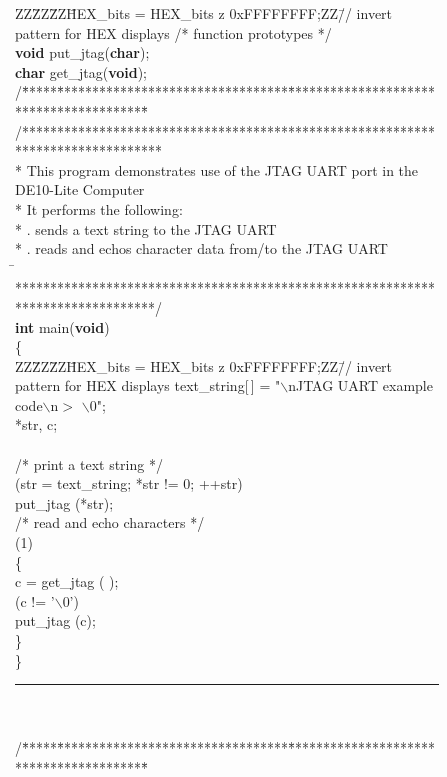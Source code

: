 \begin{figure}[h!]
\begin{center}
\begin{minipage}[t]{12.5 cm}
\begin{tabbing}
ZZ\=ZZ\=ZZ\=HEX\_bits = HEX\_bits z 0xFFFFFFFF;ZZ\=// invert pattern for HEX displays\kill
/* function prototypes */\\
{\bf void} put\_jtag({\bf char});\\
{\bf char} get\_jtag({\bf void});\\
/\=*****\=*********************************\=****************************************\=\kill
/********************************************************************************\\
\>* This program demonstrates use of the JTAG UART port in the DE10-Lite Computer\\
\>* It performs the following: \\
\>* . sends a text string to the JTAG UART\\
\>* . reads and echos character data from/to the JTAG UART\\
\=\kill
\>********************************************************************************/\\
{\bf int} main({\bf void})\\
\{\\
ZZ\=ZZ\=ZZ\=HEX\_bits = HEX\_bits z 0xFFFFFFFF;ZZ\=// invert pattern for HEX displays\kill
{} text\_string[$\,$] = "$\backslash$nJTAG UART example code$\backslash$n$>$ $\backslash$0";\\
 *str, c;\\
~\\
\>/* print a text string */\\
 (str = text\_string; *str != 0; ++str)\\
\>\>put\_jtag (*str);
~\\
\>/* read and echo characters */\\
 (1)\\
\>\{\\
\>\>c = get\_jtag ( );\\
\> (c != '$\backslash$0')\\
\>\>\>put\_jtag (c);\\
\>\}\\
\}
\rule{6.0in}{0in}~\\\\
/\=*****\=*********************************\=****************************************\=\kill

\end{tabbing}
\end{minipage}
\end{center}
\end{figure}
